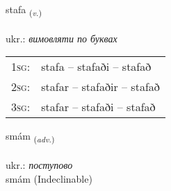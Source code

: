 \documentclass[frontgrid, backgrid]{flacards}\usepackage[]{graphicx}\usepackage[]{xcolor}
\begin{document}
\renewcommand{\flhead}{\vskip5pt \fboxsep=0pt {\small\bfseries\footnotesize Sagnorð | дієслово}}
\renewcommand{\fcfoot}{\vskip5pt \fboxsep=0pt \hspace{2pt}{\small\bfseries\footnotesize 2K}}

\renewcommand{\blhead}{\vskip5pt {\small\bfseries\footnotesize Sagnorð | дієслово }}
\renewcommand{\bcfoot}{\vskip5pt \hspace{2pt}{\small\bfseries\footnotesize 2K}}


{stafa \small{\textsubscript{(\textit{v.})}} \\[1ex] %
\textphonetic{[staːva]} \\
ukr.: \emph{вимовляти по буквах} \\  [2ex]
\renewcommand*{\arraystretch}{0.8}
\begin{tabular}{p{1cm}l}
\textsc{1sg}: & stafa -- stafaði -- stafað \\ 
\textsc{2sg}: & stafar -- stafaðir -- stafað \\ 
\textsc{3sg}: & stafar -- stafaði -- stafað \\ 
\end{tabular}
}


\renewcommand{\flhead}{\vskip5pt \fboxsep=0pt {\small\bfseries\footnotesize Atviksorð | прислівник}}
\renewcommand{\fcfoot}{\vskip5pt \fboxsep=0pt \hspace{2pt}{\small\bfseries\footnotesize 2K}}

\renewcommand{\blhead}{\vskip5pt {\small\bfseries\footnotesize Atviksorð | прислівник }}
\renewcommand{\bcfoot}{\vskip5pt \hspace{2pt}{\small\bfseries\footnotesize 2K}}


{smám \small{\textsubscript{(\textit{adv.})}} \\[1ex]
\textphonetic{[smauːm]} \\
ukr.: \emph{поступово} \\  [2ex]
smám (Indeclinable)}
\end{document}
